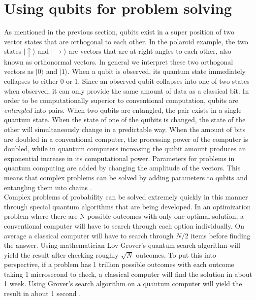 \documentclass[12pt]{article}   	%
\begin{document}
\section*{Using qubits for problem solving}
As mentioned in the previous section, qubits exist in a super position of two vector states that are orthogonal to each other. In the polaroid example, the two states $|\uparrow\rangle$ and $|\rightarrow \rangle$ are vectors that are at right angles to each other, also known as orthonormal vectors. In general we interpret these two orthogonal vectors as $|0\rangle$ and $|1 \rangle$. When a qubit is observed, its quantum state immediately collapses to either 0 or 1. Since an observed qubit collapses into one of two states when observed, it can only provide the same amount of data as a classical bit. In order to be computationally superior to conventional computation, qubits are \textit{entangled} into pairs. When two qubits are entangled, the pair exists in a single quantum state. When the state of one of the quibits is changed, the state of the other will simultaneously change in a predictable way. When the amount of bits are doubled in a conventional computer, the processing power of the computer is doubled, while in quantum computers increasing the quibit amount produces an exponential increase in its computational power. Parameters for problems in quantum computing are added by changing the amplitude of the vectors. This means that complex problems can be solved by adding parameters to qubits and entangling them into chains \cite{3MIT}.\\
Complex problems of probability can be solved extremely quickly in this manner through special quantum algorithms that are being developed. In an optimization problem where there are N possible outcomes with only one optimal solution, a conventional computer will have to search through each option individually. On average a classical computer will have to search through $N/2$ items before finding the answer. Using mathematician Lov Grover's quantum search algorithm will yield the result after checking roughly $\sqrt{N}$ outcomes. To put this into perspective, if a problem has 1 trillion possible outcomes with each outcome taking 1 microsecond to check, a classical computer will find the solution in about 1 week. Using Grover's search algorithm on a quantum computer will yield the result in about 1 second \cite{1IBM}.
\end{document}
